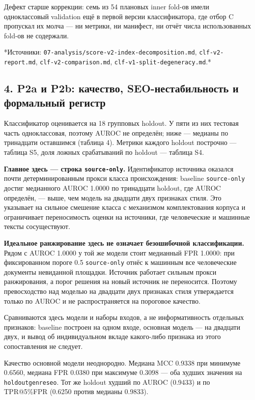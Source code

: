 \documentclass[11pt,a4paper]{article}
\renewcommand{\_}{\textunderscore\allowbreak}
\begin{document}
Дефект старше коррекции: семь из 54 плановых inner fold-ов имели одноклассовый validation
ещё в первой версии классификатора, где отбор C пропускал их молча — ни метрики,
ни манифест, ни отчёт числа использованных fold-ов не содержали.

*Источники: \texttt{07-\allowbreak{}analysis/score-\allowbreak{}v2-\allowbreak{}index-\allowbreak{}decomposition.md}, \texttt{clf-\allowbreak{}v2-\allowbreak{}report.md},
\texttt{clf-\allowbreak{}v2-\allowbreak{}comparison.md}, \texttt{clf-\allowbreak{}v1-\allowbreak{}split-\allowbreak{}degeneracy.md}.*

\subsection{4. P2a и P2b: качество, SEO-нестабильность и формальный регистр}

Классификатор оценивается на 18 групповых holdout. У пяти из них тестовая часть
одноклассовая, поэтому AUROC не определён; ниже — медианы по тринадцати
оставшимся (таблица 4). Метрики каждого holdout построчно — таблица S5, доля
ложных срабатываний по holdout — таблица S4.

\textbf{Главное здесь — строка \texttt{source-\allowbreak{}only}.} Идентификатор источника оказался почти
детерминированным прокси класса происхождения: baseline \texttt{source-\allowbreak{}only} достиг
медианного AUROC 1.0000 по тринадцати holdout, где AUROC определён, — выше, чем модель на двадцати
двух признаках стиля. Это указывает на сильное смешение класса с механизмом
комплектования корпуса и ограничивает переносимость оценки на источники, где
человеческие и машинные тексты сосуществуют.

\textbf{Идеальное ранжирование здесь не означает безошибочной классификации.} Рядом с
AUROC 1.0000 у той же модели стоит медианный FPR 1.0000: при фиксированном пороге
0.5 \texttt{source-\allowbreak{}only} отнёс к машинным все человеческие документы невиданной площадки.
Источник работает сильным прокси ранжирования, а порог решения на новый источник не
переносится. Поэтому превосходство над моделью на двадцати двух признаках стиля
утверждается только по AUROC и не распространяется на пороговое качество.

Сравниваются здесь модели и наборы входов, а не информативность отдельных
признаков: baseline построен на одном входе, основная модель — на двадцати двух,
и вывод об индивидуальном вкладе какого-либо признака из этого сопоставления не
следует.

Качество основной модели неоднородно. Медиана MCC 0.9338 при минимуме 0.6560,
медиана FPR 0.0380 при максимуме 0.3098 — оба худших значения на \texttt{holdout\_genre\_seo}.
Тот же holdout худший по AUROC (0.9433) и по TPR@5\%FPR (0.6250 против медианы
0.9833).
\end{document}
